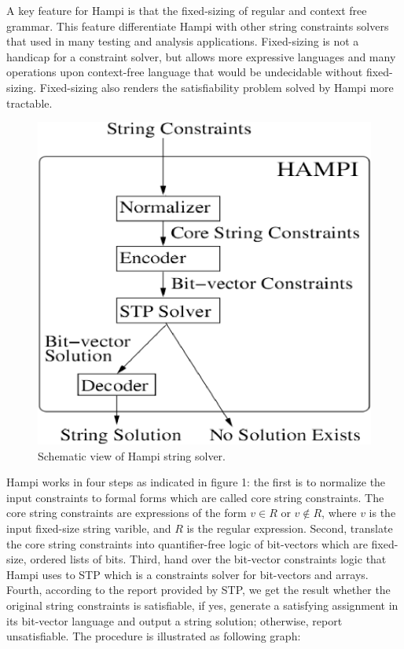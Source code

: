 A key feature for Hampi is that the fixed-sizing of regular and context free grammar. This feature differentiate Hampi with other string constraints solvers that used in many testing and analysis applications. Fixed-sizing is not a handicap for a constraint solver, but allows more expressive languages and many operations upon context-free language that would be undecidable without fixed-sizing. Fixed-sizing also renders the satisfiability problem solved by Hampi more tractable.
\begin{figure}[h]
\centering
\includegraphics[scale=0.6]{hampi.eps} 
\caption{\label{fig:Hampi} Schematic view of Hampi string solver. }
\end{figure}
Hampi works in four steps as indicated in figure 1: the first is to normalize the input constraints to formal forms which are called core string constraints. The core string constraints are expressions of the form $v\in R$ or $v\notin R$, where $v$ is the input fixed-size string varible, and $R$ is the regular expression. Second, translate the core string constraints into quantifier-free logic of bit-vectors which are fixed-size, ordered lists of bits. Third, hand over the bit-vector constraints logic that Hampi uses to STP\cite{STP} which is a constraints solver for bit-vectors and arrays. Fourth, according to the report provided by STP, we get the result whether the original string constraints is satisfiable, if yes, generate a satisfying assignment in its bit-vector language and output a string solution; otherwise, report unsatisfiable. The procedure is illustrated as following graph:

